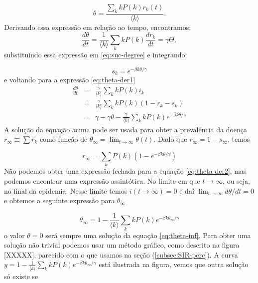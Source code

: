 \documentclass[a4paper,11pt]{report}
\begin{document}
\begin{equation}
\theta=\frac{\sum_k kP(k)r_k(t)}{\langle k\rangle}.
\end{equation}
Derivando essa express\~ao em rela\c{c}\~ao ao tempo, encontramos:
\begin{equation}
\frac{d\theta}{dt}=\frac{1}{\langle k\rangle}\sum_k kP(k)\frac{dr_k}{dt}=\gamma \Theta,
\label{eq:theta-der1}
\end{equation}
substituindo essa express\~ao em \ref{eq:suc-degree} e integrando:

\begin{equation}
s_k=e^{-\beta k \theta/\gamma}
\end{equation}
e voltando para a express\~ao \ref{eq:theta-der1}
\begin{eqnarray}
\frac{d\theta}{dt}&=&\frac{\gamma}{\langle k\rangle}\sum_k kP(k)i_k\nonumber \\
&=&\frac{\gamma}{\langle k\rangle}\sum_k kP(k)(1-r_k-s_k)\nonumber\\
&=&\gamma-\gamma\theta-\frac{\gamma}{\langle k\rangle}\sum_k kP(k)e^{-\beta k \theta/\gamma}
\label{eq:theta-der2}
\end{eqnarray}
A solu\c{c}\~ao da equa\c{c}\~ao acima pode ser usada para obter a preval\^encia da doen\c{c}a $r_{\infty}\equiv \sum r_k$ como fun\c{c}\~ao de $\theta_{\infty}=\lim_{t\to\infty}\theta(t)$. Dado que $r_{\infty}=1-s_{\infty}$, temos

\begin{equation}
r_{\infty}=\sum_k P(k)(1-e^{-\beta k\theta/\gamma})
\end{equation}
N\~ao podemos obter uma express\~ao fechada para a equa\c{c}\~ao \ref{eq:theta-der2}, mas podemos encontrar uma express\~ao assint\'otica. No limite em que $t\to \infty$, ou seja, no final da epidemia. Nesse limite temos $i(t\to\infty)=0$ e da\'i $\lim_{t\to\infty}d\theta/dt=0$ e obtemos a seguinte express\~ao para $\theta_{\infty}$

\begin{equation}
\theta_{\infty}=1-\frac{1}{\langle k\rangle}\sum_k kP(k)e^{-\beta k \theta_{\infty}/\gamma}
\label{eq:theta-inf}
\end{equation}
o valor $\theta=0$ ser\'a sempre uma solu\c{c}\~ao da equa\c{c}\~ao \ref{eq:theta-inf}. Para obter uma solu\c{c}\~ao n\~ao trivial podemos usar um m\'etodo gr\'afico, como descrito na figura [XXXXX], parecido com o que usamos na se\c{c}\~ao (\ref{subsec:SIR-perc}). A curva $y=1-\frac{1}{\langle k\rangle}\sum_k kP(k)e^{-\beta k \theta_{\infty}/\gamma}$ est\'a ilustrada na figura, vemos que outra solu\c{c}\~ao s\'o existe se 
\end{document}
